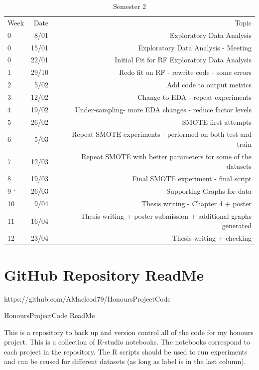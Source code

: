 \begin{table}[ht]
    \centering
    \begin{tabular}{lrr}
    \hline
    \rowcolor{LightCyan}
       Week  & Date & Topic  \\
       0     & 8/01     &  Exploratory Data Analysis      \\
       0     & 15/01    &  Exploratory Data Analysis - Meeting    \\
       0     & 22/01    &  Initial Fit for RF Exploratory Data Analysis\\
       1     & 29/10    &  Redo fit on RF - rewrite code - some errors \\
       2     &  5/02    &  Add code to output metrics      \\
       3     &  12/02   & Change to EDA - repeat experiments  \\
       4     &  19/02   & Under-sampling- more EDA changes - reduce factor levels  \\
       5     &  26/02   & SMOTE first attempts    \\
       6     &  5/03    & Repeat SMOTE experiments - performed on both test and train      \\
       7     &  12/03   & Repeat SMOTE with better parameters for some of the datasets   \\
       8     &  19/03   & Final SMOTE experiment - final script   \\
       9    `&  26/03   & Supporting Graphs for data    \\
       10    &  9/04    & Thesis writing - Chapter 4 + poster   \\
       11    &  16/04   & Thesis writing + poster submission + additional graphs generated    \\
       12    &  23/04   & Thesis writing + checking   \\
       
    \end{tabular}
    \caption{Semester 2}
    \label{tab:proj_log2}
\end{table}



\chapter{GitHub Repository ReadMe}
https://github.com/AMacleod79/HonoursProjectCode


HonoursProjectCode ReadMe

This is a repository to back up and version control all of the code for my honours project.
This is a collection of  R-studio notebooks. The notebooks correspond to each project in the repository.
The R scripts should be used to run experiments and can be reused for different datasets (as long as label is in the last column).


